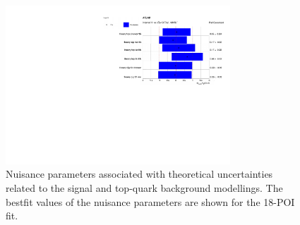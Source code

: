 \begin{figure}[htbp]
  \centering
  \includegraphics[width=0.75\textwidth]{images/fit_stxs/STXS_combine_all_xs_NP_theory_top_signal.pdf}
  \caption{Nuisance parameters associated with theoretical uncertainties related to the signal and top-quark background modellings. The bestfit values of the nuisance parameters are shown for the 18-POI fit.}
  \label{fig:constraint_theory_sig}
\end{figure}

